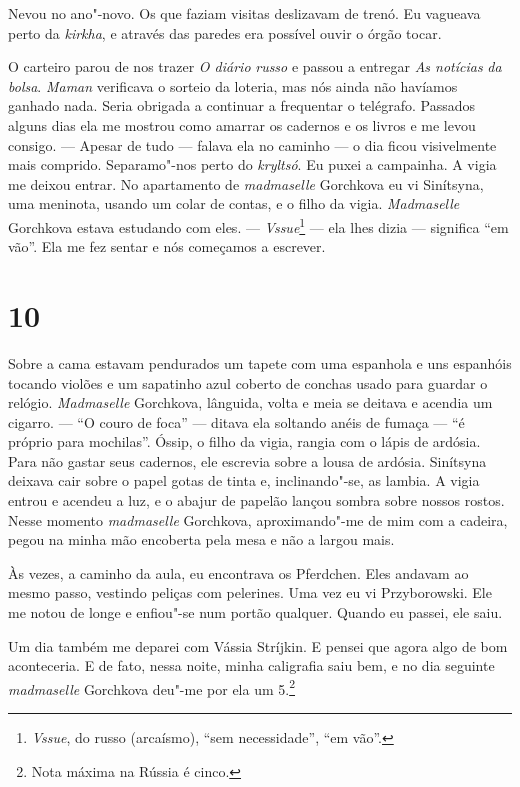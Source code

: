 Nevou no ano"-novo. Os que faziam visitas deslizavam de trenó. Eu
vagueava perto da \emph{kirkha}, e através das paredes era possível
ouvir o órgão tocar.

O carteiro parou de nos trazer \emph{O diário} \emph{russo} e passou a
entregar \emph{As notícias} \emph{da bolsa}. \emph{Maman} verificava o
sorteio da loteria, mas nós ainda não havíamos ganhado nada. Seria
obrigada a continuar a frequentar o telégrafo. Passados alguns dias ela
me mostrou como amarrar os cadernos e os livros e me levou consigo. ---
Apesar de tudo --- falava ela no caminho --- o dia ficou visivelmente
mais comprido. Separamo"-nos perto do \emph{kryltsó}. Eu puxei a
campainha. A vigia me deixou entrar. No apartamento de \emph{madmaselle}
Gorchkova eu vi Sinítsyna, uma meninota, usando um colar de contas, e o
filho da vigia. \emph{Madmaselle} Gorchkova estava estudando com eles.
--- \emph{Vssue}\footnote{\emph{Vssue}, do russo (arcaísmo), ``sem
  necessidade'', ``em vão''.} --- ela lhes dizia --- significa ``em
vão''. Ela me fez sentar e nós começamos a escrever.

\section{10}

Sobre a cama estavam pendurados um tapete com uma espanhola e uns
espanhóis tocando violões e um sapatinho azul coberto de conchas usado
para guardar o relógio. \emph{Madmaselle} Gorchkova, lânguida, volta e
meia se deitava e acendia um cigarro. --- ``O couro de foca'' --- ditava
ela soltando anéis de fumaça --- ``é próprio para mochilas''. Óssip, o
filho da vigia, rangia com o lápis de ardósia. Para não gastar seus
cadernos, ele escrevia sobre a lousa de ardósia. Sinítsyna deixava cair
sobre o papel gotas de tinta e, inclinando"-se, as lambia. A vigia entrou
e acendeu a luz, e o abajur de papelão lançou sombra sobre nossos
rostos. Nesse momento \emph{madmaselle} Gorchkova, aproximando"-me de mim
com a cadeira, pegou na minha mão encoberta pela mesa e não a largou
mais.

Às vezes, a caminho da aula, eu encontrava os Pferdchen. Eles andavam ao
mesmo passo, vestindo peliças com pelerines. Uma vez eu vi Przyborowski.
Ele me notou de longe e enfiou"-se num portão qualquer. Quando eu passei,
ele saiu.

Um dia também me deparei com Vássia Stríjkin. E pensei que agora algo de
bom aconteceria. E de fato, nessa noite, minha caligrafia saiu bem, e no
dia seguinte \emph{madmaselle} Gorchkova deu"-me por ela um 5.\footnote{Nota
  máxima na Rússia é cinco.}

